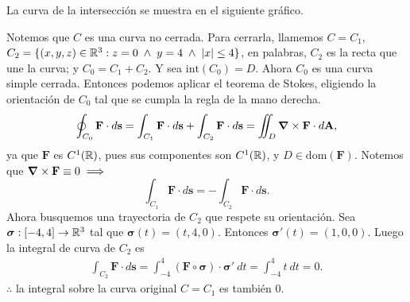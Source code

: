 
\begin{solution} 
La curva de la intersecci\'on se muestra en el siguiente gr\'afico.

\begin{center}
\end{center}

  Notemos que $C$ es una curva no cerrada. Para cerrarla, llamemos $C=C_1$, 
  $C_2=\{(x,y,z)\in\mathbb{R}^3:z=0\;\land\;y=4\;\land\;|x|\leq4\}$, en palabras, $C_2$ es la recta que une la curva; y $C_0=C_1+C_2$. Y sea $\text{int}(C_0)=D$. Ahora $C_0$ es una curva simple cerrada. Entonces podemos aplicar el teorema de Stokes, eligiendo la orientaci\'on de $C_0$ tal que se cumpla la regla de la mano derecha.
  \[
      \oint_{C_0}\mathbf{F}\cdot d\mathbf{s}= \int_{C_1}\mathbf{F}\cdot d\mathbf{s} + \int_{C_2}\mathbf{F}\cdot d\mathbf{s} = \iint_D \grad\times\mathbf{F}\cdot d\mathbf{A},
  \]
  ya que $\mathbf{F}$ es $C^1(\mathbb{R})$, pues sus componentes son $C^1(\mathbb{R})$, y $D\in\text{dom}(\mathbf{F})$.
  Notemos que $\grad\times\mathbf{F}\equiv0\implies$
  \[
     \int_{C_1}\mathbf{F}\cdot d\mathbf{s} =- \int_{C_2}\mathbf{F}\cdot d\mathbf{s}.
  \]
  Ahora busquemos una trayectoria de $C_2$ que respete su orientaci\'on. Sea $\boldsymbol{\sigma}:[-4,4]\rightarrow\mathbb{R}^3$
  tal que $\boldsymbol{\sigma}(t)=(t,4,0)$. Entonces $\boldsymbol{\sigma}'(t)=(1,0,0)$. Luego la integral de curva de $C_2$ es
  \begin{gather*}
    \int_{C_2}\mathbf{F}\cdot d\mathbf{s}
    =\int_{-4}^4 (\mathbf{F}\circ\boldsymbol{\sigma})\cdot\boldsymbol{\sigma}'\:dt
    =\int_{-4}^4 t\:dt = 0.
  \end{gather*}
  $\therefore$ la integral sobre la curva original $C=C_1$ es tambi\'en 0.
\end{solution}


